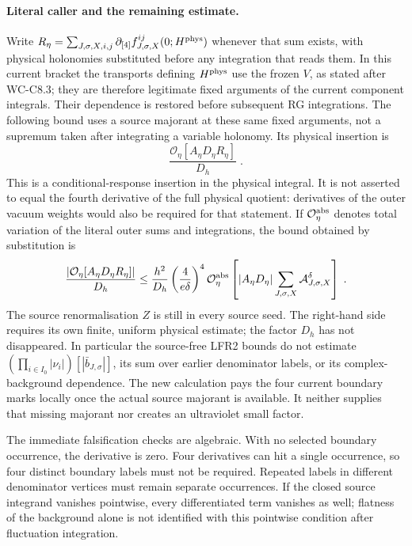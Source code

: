 \documentclass[11pt]{article}
\begin{document}
\paragraph{Literal caller and the remaining estimate.}
Write
$R_\eta=\sum_{J,\sigma,X,i,j}\partial_{[4]}
f^{ij}_{J,\sigma,X}(0;H^{\rm phys})$ whenever that sum exists,
with physical holonomies substituted before any integration that
reads them. In this current bracket the transports defining
$H^{\rm phys}$ use the frozen $V$, as stated after WC-C8.3;
they are therefore legitimate fixed arguments of the current
component integrals. Their dependence is restored before subsequent
RG integrations. The following bound uses a source majorant at
these same fixed arguments, not a supremum taken after integrating
a variable holonomy. Its physical insertion is
\begin{equation}\label{eq:c8-fourth-labelled-physical}
    \frac{\mathcal O_\eta[A_\eta D_\eta R_\eta]}{D_h}\;.
\end{equation}
This is a conditional-response insertion in the physical integral.
It is not asserted to equal the fourth derivative of the full
physical quotient: derivatives of the outer vacuum weights would
also be required for that statement.
If $\mathcal O_\eta^{\rm abs}$ denotes total variation of the
literal outer sums and integrations, the bound obtained by
substitution is
\begin{equation}\label{eq:c8-fourth-labelled-physical-bound}
    \frac{|\mathcal O_\eta[A_\eta D_\eta R_\eta]|}{D_h}
        \leq \frac{h^2}{D_h}
            \left(\frac{4}{e\delta}\right)^4
            \mathcal O_\eta^{\rm abs}\left[
                |A_\eta D_\eta|
                \sum_{J,\sigma,X}\mathcal A^\delta_{J,\sigma,X}
            \right]\;.
\end{equation}
The source renormalisation $Z$ is still in every source seed. The
right-hand side requires its own finite, uniform physical estimate;
the factor $D_h$ has not disappeared. In particular the source-free
LFR2 bounds do not estimate
$(\prod_{i\in I_0}|\nu_i|)[|\bar b_{J,\sigma}|]$, its sum over
earlier denominator labels, or its complex-background dependence.
The new calculation pays the four current boundary marks locally
once the actual source majorant is available. It neither supplies
that missing majorant nor creates an ultraviolet small factor.

The immediate falsification checks are algebraic. With no selected
boundary occurrence, the derivative is zero. Four derivatives can
hit a single occurrence, so four distinct boundary labels must not
be required. Repeated labels in different denominator vertices
must remain separate occurrences. If the closed source integrand
vanishes pointwise, every differentiated term vanishes as well;
flatness of the background alone is not identified with this
pointwise condition after fluctuation integration.
\end{document}
